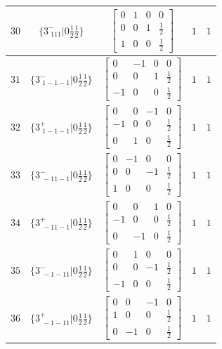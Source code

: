\documentclass[fleqn,8pt]{jsarticle}
\begin{document}
\begin{longtable}{ccccc}
$ 30 $ & $ \{3^{-}_{\,\,111}|0 \frac{1}{2} \frac{1}{2}\} $ & $ \begin{bmatrix} 0 & 1 & 0 & 0 \\ 0 & 0 & 1 & \frac{1}{2} \\ 1 & 0 & 0 & \frac{1}{2} \end{bmatrix} $ & $ 1 $ & $ 1 $ \\ \hline
$ 31 $ & $ \{3^{-}_{\,\,1-1-1}|0 \frac{1}{2} \frac{1}{2}\} $ & $ \begin{bmatrix} 0 & -1 & 0 & 0 \\ 0 & 0 & 1 & \frac{1}{2} \\ -1 & 0 & 0 & \frac{1}{2} \end{bmatrix} $ & $ 1 $ & $ 1 $ \\ \hline
$ 32 $ & $ \{3^{+}_{\,\,1-1-1}|0 \frac{1}{2} \frac{1}{2}\} $ & $ \begin{bmatrix} 0 & 0 & -1 & 0 \\ -1 & 0 & 0 & \frac{1}{2} \\ 0 & 1 & 0 & \frac{1}{2} \end{bmatrix} $ & $ 1 $ & $ 1 $ \\ \hline
$ 33 $ & $ \{3^{-}_{\,\,-11-1}|0 \frac{1}{2} \frac{1}{2}\} $ & $ \begin{bmatrix} 0 & -1 & 0 & 0 \\ 0 & 0 & -1 & \frac{1}{2} \\ 1 & 0 & 0 & \frac{1}{2} \end{bmatrix} $ & $ 1 $ & $ 1 $ \\ \hline
$ 34 $ & $ \{3^{+}_{\,\,-11-1}|0 \frac{1}{2} \frac{1}{2}\} $ & $ \begin{bmatrix} 0 & 0 & 1 & 0 \\ -1 & 0 & 0 & \frac{1}{2} \\ 0 & -1 & 0 & \frac{1}{2} \end{bmatrix} $ & $ 1 $ & $ 1 $ \\ \hline
$ 35 $ & $ \{3^{-}_{\,\,-1-11}|0 \frac{1}{2} \frac{1}{2}\} $ & $ \begin{bmatrix} 0 & 1 & 0 & 0 \\ 0 & 0 & -1 & \frac{1}{2} \\ -1 & 0 & 0 & \frac{1}{2} \end{bmatrix} $ & $ 1 $ & $ 1 $ \\ \hline
$ 36 $ & $ \{3^{+}_{\,\,-1-11}|0 \frac{1}{2} \frac{1}{2}\} $ & $ \begin{bmatrix} 0 & 0 & -1 & 0 \\ 1 & 0 & 0 & \frac{1}{2} \\ 0 & -1 & 0 & \frac{1}{2} \end{bmatrix} $ & $ 1 $ & $ 1 $ \\ \hline

\end{longtable}
\end{document}
